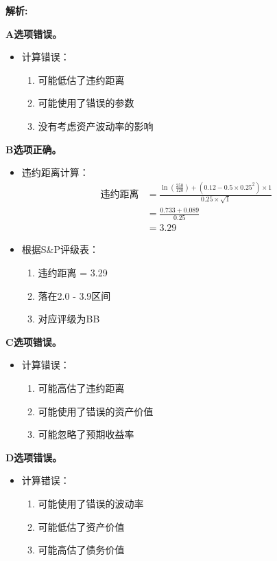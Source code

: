 \documentclass{article}
\newenvironment{explanation}
{\textbf{解析:}\par}
{\par}
\begin{document}
\begin{explanation}
    \textbf{A选项错误。}
    \begin{itemize}
        \item 计算错误：
        \begin{enumerate}
            \item 可能低估了违约距离
            \item 可能使用了错误的参数
            \item 没有考虑资产波动率的影响
        \end{enumerate}
    \end{itemize}
    
    \textbf{B选项正确。}
    \begin{itemize}
        \item 违约距离计算：
        \[
        \begin{aligned}
        \text{违约距离} &= \frac{\ln\left(\frac{250}{120}\right) + (0.12 - 0.5 \times 0.25^2) \times 1}{0.25 \times \sqrt{1}} \\
        &= \frac{0.733 + 0.089}{0.25} \\
        &= 3.29
        \end{aligned}
        \]
        \item 根据S\&P评级表：
        \begin{enumerate}
            \item 违约距离 = 3.29
            \item 落在2.0 - 3.9区间
            \item 对应评级为BB
        \end{enumerate}
    \end{itemize}
    
    \textbf{C选项错误。}
    \begin{itemize}
        \item 计算错误：
        \begin{enumerate}
            \item 可能高估了违约距离
            \item 可能使用了错误的资产价值
            \item 可能忽略了预期收益率
        \end{enumerate}
    \end{itemize}
    
    \textbf{D选项错误。}
    \begin{itemize}
        \item 计算错误：
        \begin{enumerate}
            \item 可能使用了错误的波动率
            \item 可能低估了资产价值
            \item 可能高估了债务价值
        \end{enumerate}
    \end{itemize}
\end{explanation}
\end{document}
